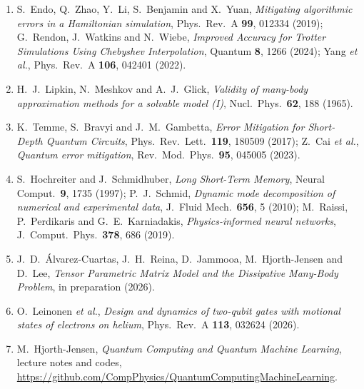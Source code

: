\documentclass[12pt,a4paper]{article}
\begin{document}
\begin{enumerate}
    \item S.~Endo, Q.~Zhao, Y.~Li, S.~Benjamin and X.~Yuan, \textit{Mitigating algorithmic errors in a Hamiltonian simulation}, Phys.\ Rev.\ A \textbf{99}, 012334 (2019); G.~Rendon, J.~Watkins and N.~Wiebe, \textit{Improved Accuracy for Trotter Simulations Using Chebyshev Interpolation}, Quantum \textbf{8}, 1266 (2024); Yang \textit{et al.}, Phys.\ Rev.\ A \textbf{106}, 042401 (2022).
    \item H.~J.~Lipkin, N.~Meshkov and A.~J.~Glick, \textit{Validity of many-body approximation methods for a solvable model (I)}, Nucl.\ Phys.\ \textbf{62}, 188 (1965).
    \item K.~Temme, S.~Bravyi and J.~M.~Gambetta, \textit{Error Mitigation for Short-Depth Quantum Circuits}, Phys.\ Rev.\ Lett.\ \textbf{119}, 180509 (2017); Z.~Cai \textit{et al.}, \textit{Quantum error mitigation}, Rev.\ Mod.\ Phys.\ \textbf{95}, 045005 (2023).
    \item S.~Hochreiter and J.~Schmidhuber, \textit{Long Short-Term Memory}, Neural Comput.\ \textbf{9}, 1735 (1997); P.~J.~Schmid, \textit{Dynamic mode decomposition of numerical and experimental data}, J.\ Fluid Mech.\ \textbf{656}, 5 (2010); M.~Raissi, P.~Perdikaris and G.~E.~Karniadakis, \textit{Physics-informed neural networks}, J.\ Comput.\ Phys.\ \textbf{378}, 686 (2019).
    \item J.~D.~\'Alvarez-Cuartas, J.~H.~Reina, D.~Jammooa, M.~Hjorth-Jensen and D.~Lee, \textit{Tensor Parametric Matrix Model and the Dissipative Many-Body Problem}, in preparation (2026).
    \item O.~Leinonen \textit{et al.}, \textit{Design and dynamics of two-qubit gates with motional states of electrons on helium}, Phys.\ Rev.\ A \textbf{113}, 032624 (2026).
    \item M.~Hjorth-Jensen, \textit{Quantum Computing and Quantum Machine Learning}, lecture notes and codes,\\ \url{https://github.com/CompPhysics/QuantumComputingMachineLearning}.
\end{enumerate}
\end{document}
